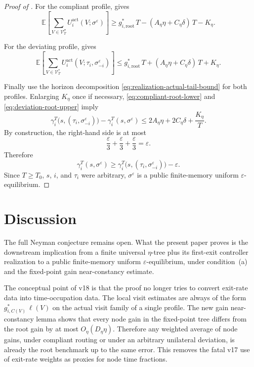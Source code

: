 \documentclass[12pt]{article}
\theoremstyle{definition}
\newcommand{\eps}{\varepsilon}
\newcommand{\E}{\mathbb{E}}
\newcommand{\1}{\mathbf{1}}
\begin{document}
\begin{proof}[Proof of ]
For the compliant profile,  gives
\begin{equation}
\label{eq:compliant-root-lower}
\E\left[
\sum_{V\in\mathcal V_T^\sigma}
U_i^{\mathrm{act}}(V;\sigma^\eps)
\right]
\ge
g_{i,\mathrm{root}}^*\,T
-
(A_\eta\eta+C_\eta\delta)\,T
-
K_\eta.
\end{equation}

For the deviating profile,  gives
\begin{equation}
\label{eq:deviation-root-upper}
\E\left[
\sum_{V\in\mathcal V_T^\tau}
U_i^{\mathrm{act}}(V;\tau_i,\sigma^\eps_{-i})
\right]
\le
g_{i,\mathrm{root}}^*\,T
+
(A_\eta\eta+C_\eta\delta)\,T
+
K_\eta.
\end{equation}

Finally use the horizon decomposition \eqref{eq:realization-actual-tail-bound}
for both profiles. Enlarging $K_\eta$ once if necessary,
\eqref{eq:compliant-root-lower} and \eqref{eq:deviation-root-upper}
imply
\[
\gamma_i^T\bigl(s,(\tau_i,\sigma^\eps_{-i})\bigr)
-
\gamma_i^T(s,\sigma^\eps)
\le
2A_\eta\eta + 2C_\eta\delta + \frac{K_\eta}{T}.
\]
By construction, the right-hand side is at most
\[
\frac{\eps}{3}+\frac{\eps}{3}+\frac{\eps}{3}=\eps.
\]
Therefore
\[
\gamma_i^T(s,\sigma^\eps)
\ge
\gamma_i^T\bigl(s,(\tau_i,\sigma^\eps_{-i})\bigr)-\eps.
\]
Since $T\ge T_0$, $s$, $i$, and $\tau_i$ were arbitrary, $\sigma^\eps$ is a
public finite-memory uniform $\eps$-equilibrium.
\end{proof}


\section{Discussion}

The full Neyman conjecture remains open. What the present paper proves is the
downstream implication from a finite universal $\eta$-tree plus its first-exit
controller realization to a public finite-memory uniform $\eps$-equilibrium,
under condition~\textnormal{(a)} and the fixed-point gain near-constancy
estimate.

The conceptual point of v18 is that the proof no longer tries to convert
exit-rate data into time-occupation data. The local visit estimates are always
of the form $g_{i,C(V)}^*\,\ell(V)$ on the actual visit family of a single
profile. The new gain near-constancy lemma shows that every node gain in the
fixed-point tree differs from the root gain by at most $O_\eta(D_\eta\eta)$.
Therefore any weighted average of node gains, under compliant routing or under
an arbitrary unilateral deviation, is already the root benchmark up to the same
error. This removes the fatal v17 use of exit-rate weights as proxies for node
time fractions.
\end{document}
